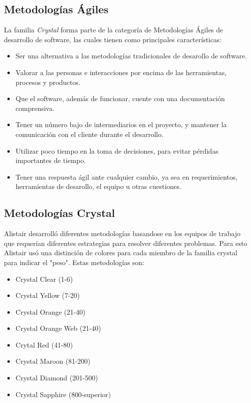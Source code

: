 \documentclass[12pt,a4paper]{article}
\begin{document}
	\subsection*{Metodolog\'ias \'Agiles}
	La familia {\itshape Crystal} forma parte de la categor\'ia de Metodolog\'ias \'Agiles de desarrollo de software, las cuales tienen como principales caracter\'isticas:
	\begin{itemize}
		\item Ser una alternativa a las metodolog\'ias tradicionales de desarollo de software.
		
		\item Valorar a las personas e interacciones por encima de las herramientas, procesos y productos.
		
		\item Que el software, adem\'as de funcionar, cuente con una documentaci\'on comprensiva.
		
		\item Tener un n\'umero bajo de intermediarios en el proyecto, y mantener la comunicaci\'on con el cliente durante el desarrollo.
		
		\item Utilizar poco tiempo en la toma de decisiones, para evitar p\'erdidas importantes de tiempo.
		
		\item Tener una respuesta \'agil ante cualquier cambio, ya sea en requerimientos, herramientas de desarollo, el equipo u otras cuestiones.
		\\
	\end{itemize}
		
	\subsection*{Metodolog\'ias Crystal}
	Alistair desarroll\'o diferentes metodolog\'ias basandose en los equipos de trabajo que requer\'ian diferentes estrategias para resolver diferentes problemas.
	Para esto Alistair us\'o una distinci\'on de colores para cada miembro de la familia crystal para indicar el "peso". Estas metodolog\'ias son:
	\begin{itemize}
		\item Crystal Clear  (1-6)
		\item Crystal Yellow (7-20)
		\item Crystal Orange (21-40)
		\item Crystal Orange Web (21-40)
		\item Crytal Red (41-80)
		\item Crystal Maroon (81-200)
		\item Crystal Diamond (201-500)
		\item Crystal Sapphire (800-superior)
	\end{itemize}
	  
\end{document}
